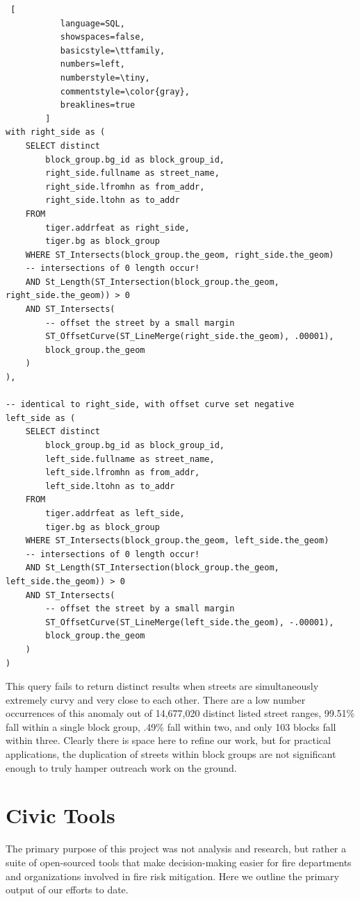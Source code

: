 \documentclass{sig-alternate}
\begin{document}
\begin{lstlisting} [
           language=SQL,
           showspaces=false,
           basicstyle=\ttfamily,
           numbers=left,
           numberstyle=\tiny,
           commentstyle=\color{gray},
           breaklines=true
        ]
with right_side as (
    SELECT distinct
        block_group.bg_id as block_group_id,
        right_side.fullname as street_name,
        right_side.lfromhn as from_addr,
        right_side.ltohn as to_addr
    FROM
        tiger.addrfeat as right_side,
        tiger.bg as block_group
    WHERE ST_Intersects(block_group.the_geom, right_side.the_geom)
    -- intersections of 0 length occur!
    AND St_Length(ST_Intersection(block_group.the_geom, right_side.the_geom)) > 0
    AND ST_Intersects(
        -- offset the street by a small margin
        ST_OffsetCurve(ST_LineMerge(right_side.the_geom), .00001),
        block_group.the_geom
    )
),

-- identical to right_side, with offset curve set negative
left_side as (
    SELECT distinct
        block_group.bg_id as block_group_id,
        left_side.fullname as street_name,
        left_side.lfromhn as from_addr,
        left_side.ltohn as to_addr
    FROM
        tiger.addrfeat as left_side,
        tiger.bg as block_group
    WHERE ST_Intersects(block_group.the_geom, left_side.the_geom)
    -- intersections of 0 length occur!
    AND St_Length(ST_Intersection(block_group.the_geom, left_side.the_geom)) > 0
    AND ST_Intersects(
        -- offset the street by a small margin
        ST_OffsetCurve(ST_LineMerge(left_side.the_geom), -.00001),
        block_group.the_geom
    )
)
\end{lstlisting}

This query fails to return distinct results when streets are simultaneously extremely curvy and very close to each other. There are a low number occurrences of this anomaly out of 14,677,020 distinct listed street ranges, 99.51\% fall within a single block group, .49\% fall within two, and only 103 blocks fall within three. Clearly there is space here to refine our work, but for practical applications, the duplication of streets within block groups are not significant enough to truly hamper outreach work on the ground.

\section{Civic Tools}

The primary purpose of this project was not analysis and research, but rather a suite of open-sourced tools that make decision-making easier for fire departments and organizations involved in fire risk mitigation. Here we outline the primary output of our efforts to date.
\end{document}
